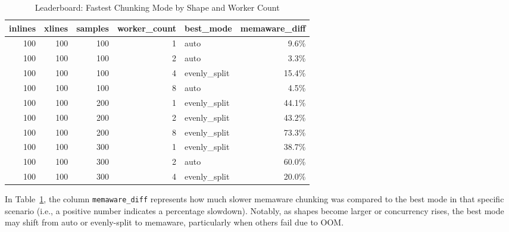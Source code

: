 \begin{table}[ht]
    \centering
    \caption{Leaderboard: Fastest Chunking Mode by Shape and Worker Count}
    \label{tab:leaderboard}
    \begin{tabular}{rrrrlr}
        \toprule
        \textbf{inlines} & \textbf{xlines} & \textbf{samples} & \textbf{worker\_count} & \textbf{best\_mode} & \textbf{memaware\_diff} \\
        \midrule
        100              & 100             & 100              & 1                      & auto                & 9.6\%                   \\
        100              & 100             & 100              & 2                      & auto                & 3.3\%                   \\
        100              & 100             & 100              & 4                      & evenly\_split       & 15.4\%                  \\
        100              & 100             & 100              & 8                      & auto                & 4.5\%                   \\
        100              & 100             & 200              & 1                      & evenly\_split       & 44.1\%                  \\
        100              & 100             & 200              & 2                      & evenly\_split       & 43.2\%                  \\
        100              & 100             & 200              & 8                      & evenly\_split       & 73.3\%                  \\
        100              & 100             & 300              & 1                      & evenly\_split       & 38.7\%                  \\
        100              & 100             & 300              & 2                      & auto                & 60.0\%                  \\
        100              & 100             & 300              & 4                      & evenly\_split       & 20.0\%                  \\
        \bottomrule
    \end{tabular}
\end{table}

In Table~\ref{tab:leaderboard}, the column \texttt{memaware\_diff} represents how much slower memaware chunking was compared to the best mode in that specific scenario (i.e., a positive number indicates a percentage slowdown).
Notably, as shapes become larger or concurrency rises, the best mode may shift from auto or evenly-split to memaware, particularly when others fail due to \ac{OOM}.

